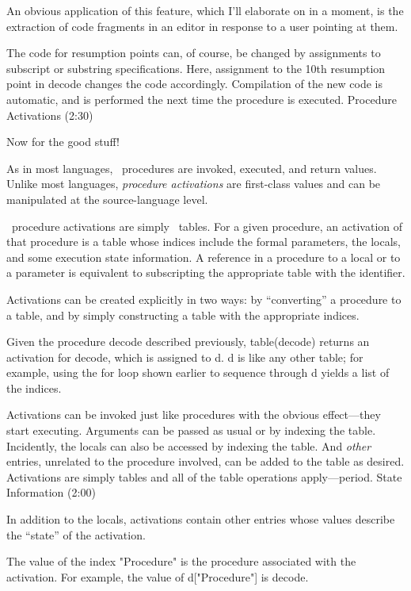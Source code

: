An obvious application of this feature, which I'll elaborate
on in a moment, is the extraction of code fragments in an editor in response
to a user pointing at them.

The code for resumption points can, of course, be changed by assignments
to subscript or substring specifications.
Here, assignment to the 10th resumption point in {\pt decode}
changes the code accordingly.
Compilation of the new code is automatic, and is performed
the next time the procedure is executed.
\NewPage
\beginsection Procedure Activations (2:30)

Now for the good stuff!

As in most languages, \EZ\ procedures are invoked, executed,
and return values.
Unlike most languages, {\sl procedure activations} are first-class
values and can be manipulated at the source-language level.

\EZ\ procedure activations are simply \EZ\ tables.
For a given procedure, an activation of that procedure is a table
whose indices include the formal parameters, the locals,
and some execution state information.
A reference in a procedure to a local or to a parameter
is equivalent to subscripting the appropriate table with the identifier.

Activations can be created explicitly in two ways:
by ``converting'' a procedure to a table, and by simply
constructing a table with the appropriate indices.

Given the procedure {\pt decode} described previously,
{\pt table(decode)} returns an activation for {\pt decode}, which
is assigned to {\pt d}.
{\pt d} is like any other table; for example,
using the {\pt for} loop shown earlier to sequence through {\pt d}
yields a list of the indices.

Activations can be invoked just like procedures
with the obvious effect---they start executing.
Arguments can be passed as usual or by indexing the table.
Incidently, the locals can also be accessed by indexing the table.
And {\sl other\/} entries, unrelated to the procedure involved,
can be added to the table as desired.
Activations are simply tables and all of the table operations apply---period.
\NewPage
\beginsection State Information (2:00)

In addition to the locals, activations contain
other entries whose values describe the ``state'' of the activation.

The value of the index {\pt "Procedure"} is the procedure
associated with the activation.
For example, the value of {\pt d["Procedure"] \rm is \pt decode}.

